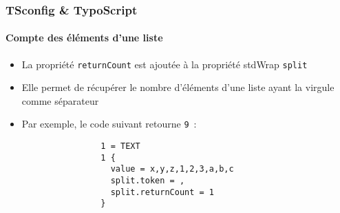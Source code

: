 
\begin{frame}[fragile]
	\frametitle{TSconfig \& TypoScript}
	\framesubtitle{Compte des éléments d'une liste}

	\lstset{basicstyle=\tiny\ttfamily}

	\begin{itemize}

		\item La propriété \texttt{returnCount} est ajoutée à la propriété stdWrap \texttt{split}

		\item Elle permet de récupérer le nombre d'éléments d'une liste ayant la virgule comme séparateur

		\item Par exemple, le code suivant retourne \texttt{9}~:

			\begin{lstlisting}
				1 = TEXT
				1 {
				  value = x,y,z,1,2,3,a,b,c
				  split.token = ,
				  split.returnCount = 1
				}
			\end{lstlisting}

	\end{itemize}

\end{frame}


